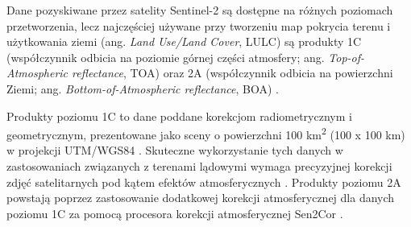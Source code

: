 \documentclass{amuthesis}
\begin{document}
Dane pozyskiwane przez satelity Sentinel-2 są dostępne na różnych
poziomach przetworzenia, lecz najczęściej używane przy tworzeniu map
pokrycia terenu i użytkowania ziemi (ang. \emph{Land Use/Land Cover},
LULC) są produkty 1C (współczynnik odbicia na poziomie górnej części
atmosfery; ang. \emph{Top-of-Atmospheric reflectance}, TOA) oraz 2A
(współczynnik odbicia na powierzchni Ziemi; ang.
\emph{Bottom-of-Atmospheric reflectance}, BOA)
\autocite{phiri_2020_sentinel2}.

Produkty poziomu 1C to dane poddane korekcjom radiometrycznym i
geometrycznym, prezentowane jako sceny o powierzchni 100
km\textsuperscript{2} (100 x 100 km) w projekcji UTM/WGS84
\autocite{esa_2015_sentinel2handbook}. Skuteczne wykorzystanie tych
danych w zastosowaniach związanych z terenami lądowymi wymaga
precyzyjnej korekcji zdjęć satelitarnych pod kątem efektów
atmosferycznych \autocite{main-knorn_2017_Sen2Cor}. Produkty poziomu 2A
powstają poprzez zastosowanie dodatkowej korekcji atmosferycznej dla
danych poziomu 1C za pomocą procesora korekcji atmosferycznej Sen2Cor
\autocite{main-knorn_2017_Sen2Cor}.
\end{document}
